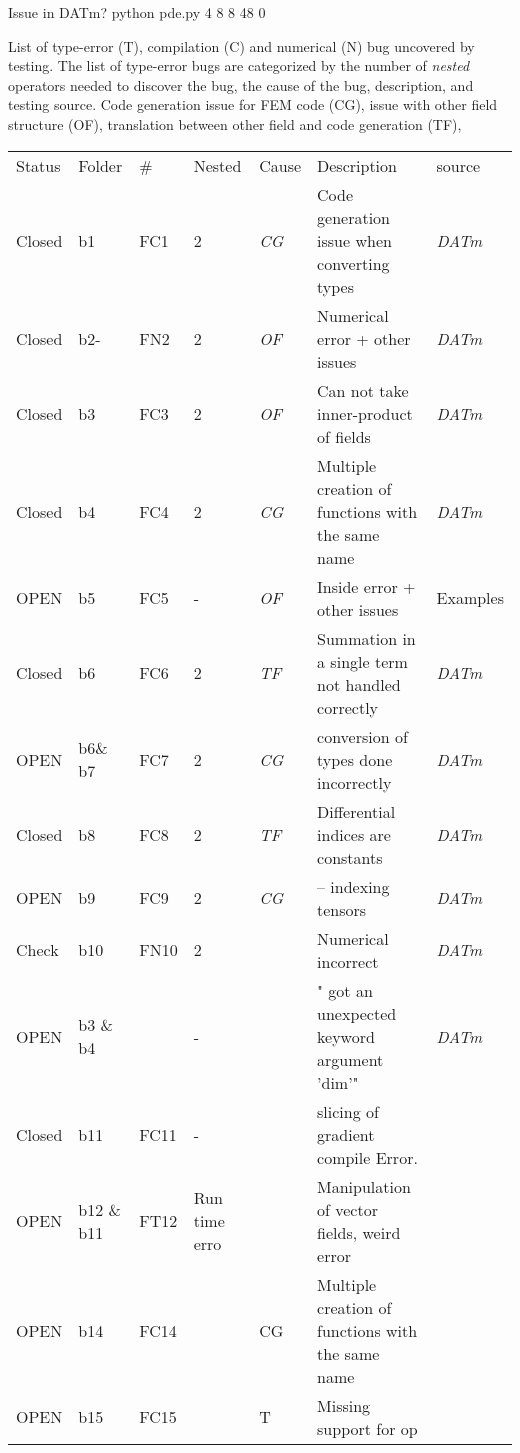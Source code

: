 \documentclass{article}
\newcommand{\fontit}[1]{\textit{#1}}
\newcommand{\checkname}[0]{\textit{DATm}}
\begin{document}
Issue in DATm?
 python pde.py 4  8 8 48 0 



List of type-error (T), compilation (C) and numerical (N) bug uncovered by testing.
 The list of type-error bugs are categorized by the number of \fontit{nested} operators needed to discover the bug,  the cause of the bug, description, and testing source.
 Code generation issue for FEM code (CG), issue with other field structure (OF), translation between other field and code generation (TF),
\newline 
\begin{tabular}{|ll|llll|l|}
\hline
Status & Folder&\# &Nested & Cause & Description & source\\
Closed& b1 & FC1 &2&\fontit{CG}&Code generation issue when converting types&\checkname{}\\
Closed &b2- & FN2 &2&\fontit{OF}&Numerical error + other issues&\checkname{}\\
Closed&b3  & FC3 &2&\fontit{OF}& Can not take inner-product of fields&\checkname{} \\
Closed&b4  & FC4 &2&\fontit{CG}&Multiple creation of functions with the same name &\checkname{}\\
OPEN&b5 &FC5 &-&\fontit{OF}& Inside error + other issues& Examples\\
Closed &b6 &FC6 &2&\fontit{TF} &  Summation in a single term not handled correctly & \checkname{}\\
OPEN& b6\& b7 &FC7 &2& \fontit{CG}& conversion of types done incorrectly & \checkname{}\\
Closed &b8 &FC8 &2&  \fontit{TF}&Differential indices are constants& \checkname{}\\
OPEN&b9 &FC9 &2&  \fontit{CG}&-- indexing tensors& \checkname{}\\
Check &b10 &FN10 &2&  &Numerical incorrect& \checkname{}\\
OPEN & b3 \& b4 &  & -& &" got an unexpected keyword argument 'dim'"& \checkname{}\\
Closed & b11 & FC11 &-& &slicing of gradient compile Error.\\
OPEN & b12 \& b11 & FT12 &Run time erro& &Manipulation of vector fields, weird error\\
OPEN & b14 &FC14& &CG&Multiple creation of functions with the same name\\
OPEN & b15 &FC15& &T& Missing support for op\\
\hline
\end{tabular}

\end{document}
